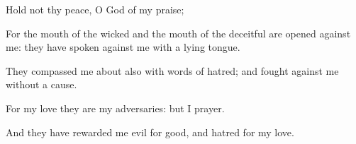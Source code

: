 {\Q {}Hold not thy
peace, O
God of my
praise;


\par }{\Q {}For the
mouth of the
wicked and the
mouth of the
deceitful are
opened against me: they have
spoken against me with a
lying
tongue.


\par }{\Q {}They
compassed me about also with
words of
hatred; and
fought against me without a
cause.


\par }{\Q {}For my
love they are my
adversaries: but I
{}
prayer.


\par }{\Q {}And they have
rewarded me
evil for
good, and
hatred for my
love.


\par }{\BB \par }
